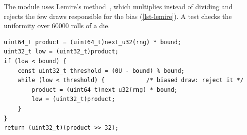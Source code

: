 The module uses Lemire's method~\cite{lemire2019}, which multiplies instead of dividing and
rejects the few draws responsible for the bias (\cref{lst-lemire}). A test checks the
uniformity over \num{60000} rolls of a die.

\begin{lstlisting}[caption={Uniform integer in $[0, \mathit{bound})$
                            (\fichier{src/core/rng.c}).}, label={lst-lemire}]
uint64_t product = (uint64_t)next_u32(rng) * bound;
uint32_t low = (uint32_t)product;
if (low < bound) {
    const uint32_t threshold = (0U - bound) % bound;
    while (low < threshold) {            /* biased draw: reject it */
        product = (uint64_t)next_u32(rng) * bound;
        low = (uint32_t)product;
    }
}
return (uint32_t)(product >> 32);
\end{lstlisting}
